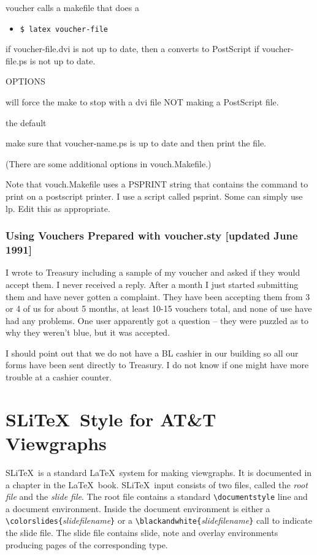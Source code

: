 voucher calls a makefile that does a 
\begin{itemize}
  \item[]
        \verb|$ latex voucher-file|
\end{itemize}
if voucher-file.dvi is not up to date, then a converts to PostScript
if voucher-file.ps is not up to date.

\noindent OPTIONS
\begin{description}
  \item[dvi]will force the make to stop with a dvi file NOT
	making a PostScript file.
  \item[ps]the default
  \item[print]make sure that voucher-name.ps is up to date and then print
	the file.
  \item 
\end{description}

(There are some additional options in vouch.Makefile.)

Note that vouch.Makefile uses a PSPRINT string that contains the
command to print on a postscript printer.  I use a script called
psprint.  Some can simply use lp.  Edit this as appropriate.


\section{Using Vouchers Prepared with voucher.sty [updated June 1991]}

I wrote to Treasury including a sample of my voucher and asked if they
would accept them.  I never received a reply.  After a month I just
started submitting them and have never gotten a complaint.  They have
been accepting them from 3 or 4 of us for about 5 months, at least
10-15 vouchers total, and none of use have had any problems.  One user
apparently got a question -- they were puzzled as to why they weren't
blue, but it was accepted.

I should point out that we do not have a BL cashier in our building so
all our forms have been sent directly to Treasury.  I do not know if
one might have more trouble at a cashier counter.

\part{SLi\TeX\ Style for AT\&T Viewgraphs}
SLi\TeX\ is a standard \LaTeX\ system for making viewgraphs.  It is
documented in a chapter in the \LaTeX\ book\cite{bib:latex}.  SLi\TeX\
input consists of two files, called the {\it root file} and the {\it
slide file}.  The root file contains a standard \verb|\documentstyle|
line and a document environment.  Inside the document environment is
either a \verb|\colorslides{|{\it slidefilename}\verb|}| or a
\verb|\blackandwhite{|{\it slidefilename}\verb|}| call to indicate the
slide file.  The slide file contains slide, note and overlay
environments producing pages of the corresponding type.

